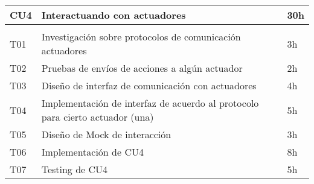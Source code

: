 \begin{table}[h!]
    \begin{tabular}{lll}
	\hline
	CU4 & Interactuando con actuadores & 30h \\
	\hline \\
	T01 & Investigación sobre protocolos de comunicación actuadores & 3h \\
	T02 & Pruebas de envíos de acciones a algún actuador & 2h \\
	T03 & Diseño de interfaz de comunicación con actuadores & 4h \\
	T04 & Implementación de interfaz de acuerdo al protocolo para cierto actuador (una) & 5h \\
	T05 & Diseño de Mock de interacción & 3h \\
	T06 & Implementación de CU4 & 8h \\
	T07 & Testing de CU4 & 5h \\
	\hline
    \end{tabular}
\end{table}

